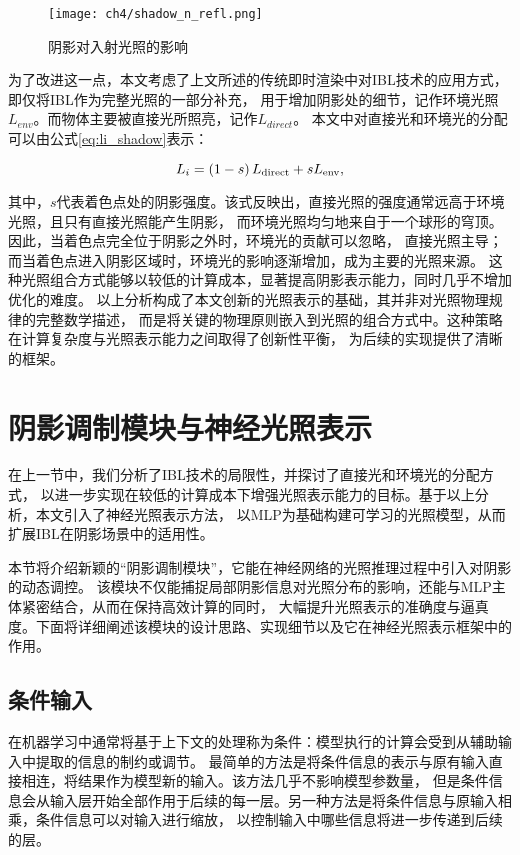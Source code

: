 \begin{figure}[htb]
  \centering
  \texttt{[image: ch4/shadow\_n\_refl.png]}
  \caption{阴影对入射光照的影响}
  \label{fig:shadow_n_refl}
\end{figure}

为了改进这一点，本文考虑了上文所述的传统即时渲染中对IBL技术的应用方式，即仅将IBL作为完整光照的一部分补充，
用于增加阴影处的细节，记作环境光照$L_{env}$。而物体主要被直接光所照亮，记作$L_{direct}$。
本文中对直接光和环境光的分配可以由公式\eqref{eq:li_shadow}表示：

\begin{equation}
  \label{eq:li_shadow}
  L_i=\left(1-s\right)L_{\rm{direct}}+sL_{\rm{env}},
  \end{equation}

其中，$s$代表着色点处的阴影强度。该式反映出，直接光照的强度通常远高于环境光照，且只有直接光照能产生阴影，
而环境光照均匀地来自于一个球形的穹顶。因此，当着色点完全位于阴影之外时，环境光的贡献可以忽略，
直接光照主导；而当着色点进入阴影区域时，环境光的影响逐渐增加，成为主要的光照来源。
这种光照组合方式能够以较低的计算成本，显著提高阴影表示能力，同时几乎不增加优化的难度。
以上分析构成了本文创新的光照表示的基础，其并非对光照物理规律的完整数学描述，
而是将关键的物理原则嵌入到光照的组合方式中。这种策略在计算复杂度与光照表示能力之间取得了创新性平衡，
为后续的实现提供了清晰的框架。

\section{阴影调制模块与神经光照表示}

在上一节中，我们分析了IBL技术的局限性，并探讨了直接光和环境光的分配方式，
以进一步实现在较低的计算成本下增强光照表示能力的目标。基于以上分析，本文引入了神经光照表示方法，
以MLP为基础构建可学习的光照模型，从而扩展IBL在阴影场景中的适用性。

本节将介绍新颖的“阴影调制模块”，它能在神经网络的光照推理过程中引入对阴影的动态调控。
该模块不仅能捕捉局部阴影信息对光照分布的影响，还能与MLP主体紧密结合，从而在保持高效计算的同时，
大幅提升光照表示的准确度与逼真度。下面将详细阐述该模块的设计思路、实现细节以及它在神经光照表示框架中的作用。

\subsection{条件输入}

在机器学习中通常将基于上下文的处理称为条件：模型执行的计算会受到从辅助输入中提取的信息的制约或调节。
最简单的方法是将条件信息的表示与原有输入直接相连，将结果作为模型新的输入。该方法几乎不影响模型参数量，
但是条件信息会从输入层开始全部作用于后续的每一层。另一种方法是将条件信息与原输入相乘，条件信息可以对输入进行缩放，
以控制输入中哪些信息将进一步传递到后续的层。

